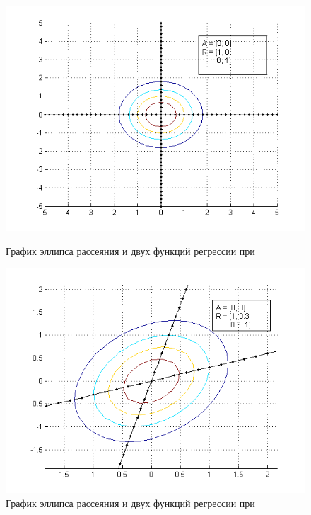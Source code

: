 \begin{figure}[h]
  \begin{minipage}[h]{0.49\linewidth}
    \includegraphics[width=1\linewidth]{../pic/new/normal_regr_1}
    \caption{График эллипса рассеяния и двух функций регрессии при}\label{pic:normal_regr_start}
  \end{minipage}
  \hfill
  \begin{minipage}[h]{0.49\linewidth}
    \vspace{4mm}
    \includegraphics[width=1\linewidth]{../pic/new/normal_regr_2}
    \caption{График эллипса рассеяния и двух функций регрессии при}
  \end{minipage}
\end{figure}

